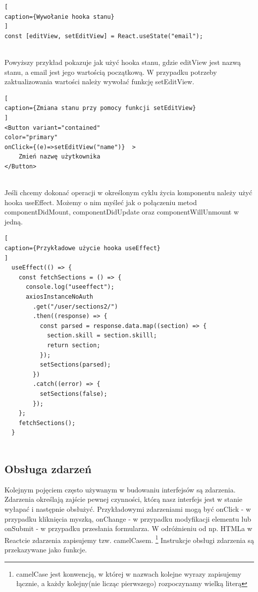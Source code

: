 \documentclass[oneside,polski,logo,indent]{amuthesis}
\begin{document}
\begin{enumerate}
\begin{enumerate}
\begin{lstlisting}[
caption={Wywołanie hooka stanu}
]
const [editView, setEditView] = React.useState("email");


\end{lstlisting}

Powyższy przykład pokazuje jak użyć hooka stanu, gdzie editView jest nazwą stanu, a email jest jego wartością początkową. W przypadku potrzeby zaktualizowania wartości należy 
wywołać funkcję setEditView.


\begin{lstlisting}[
caption={Zmiana stanu przy pomocy funkcji setEditView}
]
<Button variant="contained" 
color="primary" 
onClick={(e)=>setEditView("name")}  >
	Zmień nazwę użytkownika
</Button>


\end{lstlisting}

Jeśli chcemy dokonać operacji w określonym cyklu życia komponentu należy użyć hooka useEffect. Możemy o nim myśleć jak o połączeniu metod componentDidMount, componentDidUpdate oraz componentWillUnmount w jedną.


\begin{lstlisting}[
caption={Przykładowe użycie hooka useEffect}
]
  useEffect(() => {
    const fetchSections = () => {
      console.log("useeffect");
      axiosInstanceNoAuth
        .get("/user/sections2/")
        .then((response) => {
          const parsed = response.data.map((section) => {
            section.skill = section.skilll;
            return section;
          });
          setSections(parsed);
        })
        .catch((error) => {
          setSections(false);
        });
    };
    fetchSections();
  }


\end{lstlisting}

\subsection{Obsługa zdarzeń}
{
Kolejnym pojęciem często używanym w budowaniu interfejsów są zdarzenia. Zdarzenia określają zajście pewnej czynności, którą nasz interfejs jest w stanie wyłapać i następnie obsłużyć.
Przykładowymi zdarzeniami mogą być onClick - w przypadku kliknięcia myszką, onChange - w przypadku modyfikacji elementu lub onSubmit - w przypadku przesłania formularza.
W odróżnieniu od np. HTMLa w Reactcie zdarzenia zapisujemy tzw. camelCasem. \footnote{camelCase jest konwencją, w której w nazwach kolejne wyrazy zapisujemy łącznie, a każdy kolejny(nie licząc pierwszego) rozpoczynamy wielką literą}
Instrukcje obsługi zdarzenia są przekazywane jako funkcje.

}
\end{enumerate}
\end{enumerate}
\end{document}
